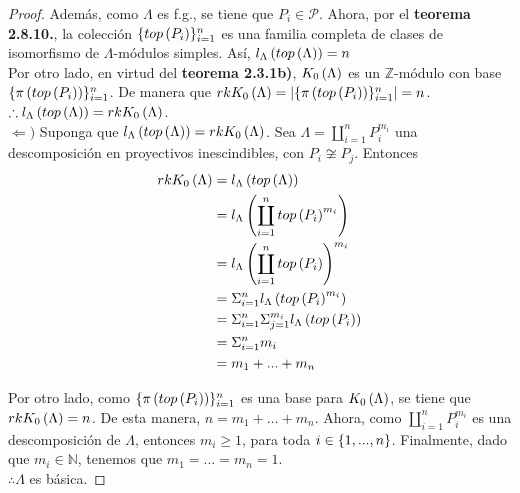 \documentclass{article}
\begin{document}
\begin{enumerate}[label=\textbf{Ej \arabic*.}]
\begin{proof}
			Además, como $\Lambda$ es f.g., se tiene que $P_{i}\in\mathcal{P}$. Ahora, por el \textbf{teorema 2.8.10.}, la colección $\{top\left(P_{i}\right)\}_{i=1}^{n}$ es una familia completa de clases de isomorfismo de $\Lambda$-módulos simples. Así, $l_{\Lambda}\left(top\left(\Lambda\right)\right)=n$\\
			
			Por otro lado, en virtud del \textbf{teorema 2.3.1b)}, $K_{0}\left(\Lambda\right)$ es un $\mathbb{Z}$-módulo con base $\{\pi\left(top\left(P_{i}\right)\right)\}_{i=1}^{n}$. De manera que $rkK_{0}\left(\Lambda\right)=\left|\{\pi\left(top\left(P_{i}\right)\right)\}_{i=1}^{n}\right|=n$.\\
			$\therefore l_{\Lambda}\left(top\left(\Lambda\right)\right)=rkK_{0}\left(\Lambda\right)$.\\
			
			$\boxed{\Leftarrow )}$ Suponga que $l_{\Lambda}\left(top\left(\Lambda\right)\right)=rkK_{0}\left(\Lambda\right)$. Sea $\Lambda=\displaystyle\coprod_{i=1}^{n}P_{i}^{m_{i}}$ una descomposición en proyectivos inescindibles, con $P_{i} \not\cong P_{j}$. Entonces
			\begin{align*}
				rkK_{0}\left(\Lambda\right)&=l_{\Lambda}\left(top\left(\Lambda\right)\right)\\
				&=l_{\Lambda}\left(\displaystyle\coprod_{i=1}^{n}top\left(P_{i}\right)^{m_{i}}\right)\\
				&=l_{\Lambda}\left(\displaystyle\coprod_{i=1}^{n}top\left(P_{i}\right)\right)^{m_{i}}\\
				&=\displaystyle\Sigma_{i=1}^{n}l_{\Lambda}\left(top\left(P_{i}\right)^{m_{i}}\right)\\
				&=\displaystyle\Sigma_{i=1}^{n}\displaystyle\Sigma_{j=1}^{m_{i}}l_{\Lambda}\left(top\left(P_{i}\right)\right)\\
				&=\displaystyle\Sigma_{i=1}^{n}m_{i}\\
				&=m_{1}+...+m_{n}
			\end{align*}
			
			Por otro lado, como $\{\pi\left(top\left(P_{i}\right)\right)\}_{i=1}^{n}$ es una base para $K_{0}\left(\Lambda\right)$, se tiene que $rkK_{0}\left(\Lambda\right)=n$. De esta manera, $n=m_{1}+...+m_{n}$. Ahora, como $\displaystyle\coprod_{i=1}^{n}P_{i}^{m_{i}}$ es una descomposición de $\Lambda$, entonces $m_{i} \geq 1$, para toda $i\in\left\{1,...,n\right\}$. Finalmente, dado que $m_{i}\in\mathbb{N}$, tenemos que $m_{1}=...=m_{n}=1$.\\
			$\therefore\Lambda$ es básica.
		\end{proof}
		

\end{enumerate}
\end{document}
